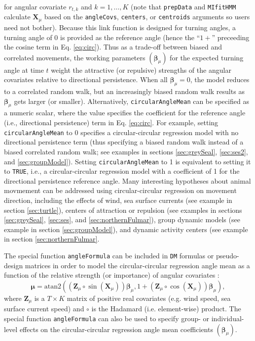 \documentclass[12pt]{article}\usepackage[]{graphicx}\usepackage[]{xcolor}
\begin{document}
for angular covariate $r_{t,k}$ and $k=1,\ldots,K$ (note that \verb|prepData| and \verb|MIfitHMM| calculate ${\mathbf X}_\mu$ based on the \verb|angleCovs|, \verb|centers|, or \verb|centroids| arguments so users need not bother). Because this link function is designed for turning angles, a turning angle of 0 is provided as the reference angle (hence the ``$1+$'' preceeding the cosine term in Eq. \ref{eq:circ}).  Thus as a trade-off between biased and correlated movements, the working parameters $({\boldsymbol \beta}_\mu)$ for the expected turning angle at time $t$ weight the attractive (or repulsive) strengths of the angular covariates relative to directional persistence.  When all ${\boldsymbol \beta}_\mu=0$, the model reduces to a correlated random walk, but an increasingly biased random walk results as ${\boldsymbol \beta}_\mu$ gets larger (or smaller). Alternatively, \verb|circularAngleMean| can be specified as a numeric scalar, where the value specifies the coefficient for the reference angle (i.e., directional persistence) term in Eq. \ref{eq:circ}. For example, setting \verb|circularAngleMean| to 0 specifies a circular-circular regression model with no directional persistence term (thus specifying a biased random walk instead of a biased correlated random walk; see examples in sections \ref{sec:greySeal}, \ref{sec:ses2}, and \ref{sec:groupModel}). Setting \verb|circularAngleMean| to 1 is equivalent to setting it to \verb|TRUE|, i.e., a circular-circular regression model with a coefficient of 1 for the directional persistence reference angle. Many interesting hypotheses about animal movmement can be addressed using circular-circular regression on movement direction, including the effects of wind, sea surface currents (see example in section \ref{sec:turtle}), centers of attraction or repulsion (see examples in sections \ref{sec:greySeal}, \ref{sec:ses}, and \ref{sec:northernFulmar}), group dynamic models (see example in section \ref{sec:groupModel}), and dynamic activity centers (see example in section \ref{sec:northernFulmar}.

The special function \verb|angleFormula| can be included in \verb|DM| formulas or pseudo-design matrices in order to model the circular-circular regression angle mean as a function of the relative strength (or importance) of angular covariates \citep{RivestEtAl2016}:
\begin{equation}
  {\boldsymbol \mu}=\text{atan2}(({\mathbf Z}_\mu \circ \sin({\mathbf X}_\mu)){\boldsymbol \beta}_\mu,1+({\mathbf Z}_\mu \circ \cos({\mathbf X}_\mu)){\boldsymbol \beta}_\mu),
  \label{eq:circ2}
\end{equation}
where ${\mathbf Z}_\mu$ is a $T \times K$ matrix of positive real covariates (e.g. wind speed, sea surface current speed) and $\circ$ is the Hadamard (i.e. element-wise) product.  The special function \verb|angleFormula| can also be used to specify group- or individual-level effects on the circular-circular regression angle mean coefficients $({\boldsymbol \beta}_\mu)$.
\end{document}
